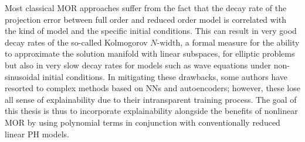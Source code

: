 Most classical \acl{MOR} approaches suffer from the fact that the decay rate of the projection error between full order and reduced order model is correlated with the kind of model and the specific initial conditions.
This can result in very good decay rates of the so-called Kolmogorov $N\text{-width}$, a formal measure for the ability to approximate the solution manifold with linear subspaces, for elliptic problems but also in very slow decay rates for models such as wave equations under non-sinusoidal initial conditions.
In mitigating these drawbacks, some authors have resorted to complex methods based on \aclp{NN} and autoencoders; however, these lose all sense of explainability due to their intransparent training process.
The goal of this thesis is thus to incorporate explainability alongside the benefits of nonlinear \acl{MOR} by using polynomial terms in conjunction with conventionally reduced linear \acl{PH} models.
